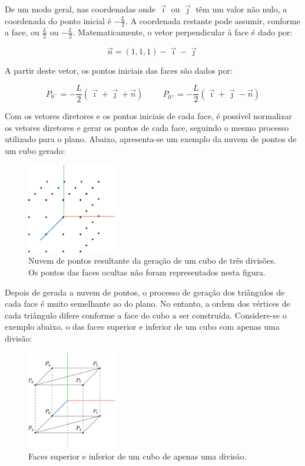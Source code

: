 \documentclass[12pt, a4paper]{article}
\begin{document}
De um modo geral, nas coordenadas onde $\vec{\imath}$ ou $\vec{\jmath}$ têm um valor não nulo, a
coordenada do ponto inicial é $-\frac{L}{2}$. A coordenada restante pode assumir, conforme a face,
ou $\frac{L}{2}$ ou $-\frac{L}{2}$. Matematicamente, o vetor perpendicular à face é dado por:

$$
\vec{n} = (1, 1, 1) - \vec{\imath} - \vec{\jmath}
$$

A partir deste vetor, os pontos iniciais das faces são dados por:

$$
P_{0^-} = -\frac{L}{2} \left ( \vec{\imath} + \vec{\jmath} + \vec{n} \right )
\hspace{1cm}
P_{0^+} = -\frac{L}{2} \left ( \vec{\imath} + \vec{\jmath} - \vec{n} \right )
$$

Com os vetores diretores e os pontos iniciais de cada face, é possível normalizar os vetores
diretores e gerar os pontos de cada face, seguindo o mesmo processo utilizado para o plano. Abaixo,
apresenta-se um exemplo da nuvem de pontos de um cubo gerado:

\begin{figure}[H]
    \centering
    \includegraphics[width=0.35\textwidth]{res/figures/CubePoints.pdf}
    \caption{
        \onehalfspacing
        Nuvem de pontos resultante da geração de um cubo de três divisões. Os pontos das faces
        ocultas não foram representados nesta figura.
    }
\end{figure}

Depois de gerada a nuvem de pontos, o processo de geração dos triângulos de cada face é muito
semelhante ao do plano. No entanto, a ordem dos vértices de cada triângulo difere conforme a face do
cubo a ser construída. Considere-se o exemplo abaixo, o das faces superior e inferior de um cubo com
apenas uma divisão:

\begin{figure}[H]
    \centering
    \includegraphics[width=0.35\textwidth]{res/figures/CubeFaces.pdf}
    \caption{Faces superior e inferior de um cubo de apenas uma divisão.}
\end{figure}
\end{document}
